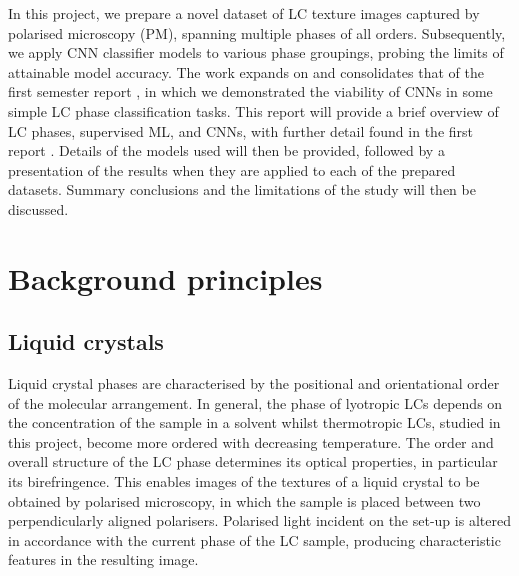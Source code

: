 \documentclass[12pt]{article}
\begin{document}
In this project, we prepare a novel dataset of LC texture images captured by polarised microscopy (PM), spanning multiple phases of all orders. Subsequently, we apply CNN classifier models to various phase groupings, probing the limits of attainable model accuracy. The work expands on and consolidates that of the first semester report \cite{Heaton20}, in which we demonstrated the viability of CNNs in some simple LC phase classification tasks. This report will provide a brief overview of LC phases, supervised ML, and CNNs, with further detail found in the first report \cite{Heaton20}. Details of the models used will then be provided, followed by a presentation of the results when they are applied to each of the prepared datasets. Summary conclusions and the limitations of the study will then be discussed.
\section{Background principles}

\subsection{Liquid crystals}
Liquid crystal phases are characterised by the positional and orientational order of the molecular arrangement. In general, the phase of lyotropic LCs depends on the concentration of the sample in a solvent whilst thermotropic LCs, studied in this project, become more ordered with decreasing temperature. The order and overall structure of the LC phase determines its optical properties, in particular its birefringence. This enables images of the textures of a liquid crystal to be obtained by polarised microscopy, in which the sample is placed between two perpendicularly aligned polarisers. Polarised light incident on the set-up is altered in accordance with the current phase of the LC sample, producing characteristic features in the resulting image.
\end{document}
